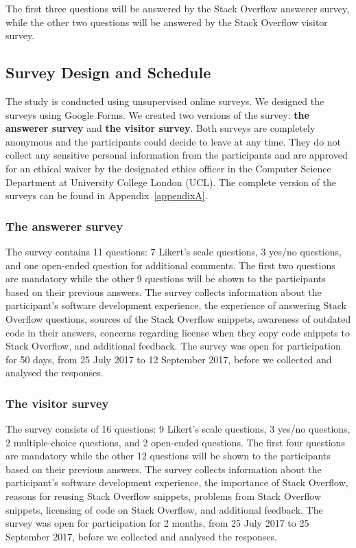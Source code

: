 \documentclass{svjour3}                     %
\begin{document}
The first three questions will be answered by
the Stack Overflow answerer survey, while the other two questions will be
answered by the Stack Overflow visitor survey.

\subsection{Survey Design and Schedule}
The study is conducted using unsupervised online surveys. We designed the surveys using
Google Forms. We created two versions of the
survey: \textbf{the answerer survey} and \textbf{the visitor survey}. Both
surveys are completely anonymous and the participants could decide to leave at
any time. They do not collect any sensitive personal information from the
participants and are approved for an ethical waiver by the designated ethics
officer in the Computer Science Department at University College London (UCL). 
The complete version of the surveys can be found in 
Appendix~\ref{appendixA}.

\subsubsection{The answerer survey} 
The survey contains 11 questions: 7 Likert's
scale questions, 3 yes/no questions, and one open-ended question for additional
comments. The first two questions are mandatory while the other 9 questions will
be shown to the participants based on their previous answers. The survey
collects information about the participant's software development experience, the
experience of answering Stack Overflow questions, sources of the Stack Overflow
snippets, awareness of outdated code in their answers, concerns regarding
license when they copy code snippets to Stack Overflow, and additional
feedback. The survey was open for participation for 50 days, from 25 July 2017
to 12 September 2017, before we collected and analysed the responses.

\subsubsection{The visitor survey} 
The survey consists of 16 questions: 9 Likert's
scale questions, 3 yes/no questions, 2 multiple-choice questions, and 2
open-ended questions. The first four questions are mandatory while the other 12
questions will be shown to the participants based on their previous answers. The
survey collects information about the participant's software development
experience, the importance of Stack Overflow, reasons for reusing Stack Overflow
snippets, problems from Stack Overflow snippets, licensing of code on Stack
Overflow, and additional feedback. The survey was open for participation for 2 months, 
from 25 July 2017 to 25 September 2017, before we collected and analysed
the responses.
\end{document}
